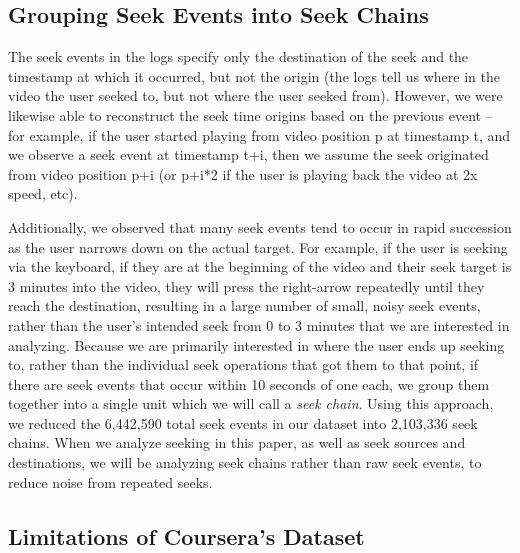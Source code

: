 \documentclass{sigchi}
\begin{document}
\subsection{Grouping Seek Events into Seek Chains}

The seek events in the logs specify only the destination of the seek and the timestamp at which it occurred, but not the origin (the logs tell us where in the video the user seeked to, but not where the user seeked from). However, we were likewise able to reconstruct the seek time origins based on the previous event -- for example, if the user started playing from video position p at timestamp t, and we observe a seek event at timestamp t+i, then we assume the seek originated from video position p+i (or p+i*2 if the user is playing back the video at 2x speed, etc).

Additionally, we observed that many seek events tend to occur in rapid succession as the user narrows down on the actual target. For example, if the user is seeking via the keyboard, if they are at the beginning of the video and their seek target is 3 minutes into the video, they will press the right-arrow repeatedly until they reach the destination, resulting in a large number of small, noisy seek events, rather than the user's intended seek from 0 to 3 minutes that we are interested in analyzing. Because we are primarily interested in where the user ends up seeking to, rather than the individual seek operations that got them to that point, if there are seek events that occur within 10 seconds of one each, we group them together into a single unit which we will call a \textit{seek chain}. Using this approach, we reduced the 6,442,590 total seek events in our dataset into 2,103,336 seek chains. When we analyze seeking in this paper, as well as seek sources and destinations, we will be analyzing seek chains rather than raw seek events, to reduce noise from repeated seeks.


\subsection{Limitations of Coursera's Dataset}
\end{document}
